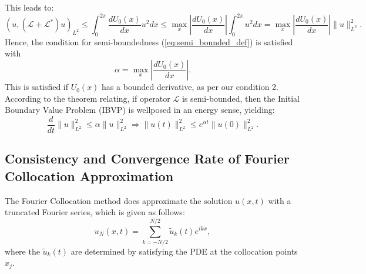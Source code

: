 This leads to:
\begin{equation}
	(u, (\mathcal{L}+\mathcal{L}^*)u)_{L^2} \leq \int_0^{2\pi} \frac{dU_0(x)}{dx}u^2 dx \leq  \max_x\left|\frac{dU_0(x)}{dx}\right| \int_0^{2\pi} u^2 dx = \max_x\left|\frac{dU_0(x)}{dx}\right| \|u\|^2_{L^2}.
	\label{eq:wellposed_cond_deriv}
\end{equation}
Hence, the condition for semi-boundedness (\ref{eq:semi_bounded_def}) is satisfied with
\begin{equation}
	\alpha = \max_x\left|\frac{dU_0(x)}{dx}\right|.
	\label{eq:alpha_val}
\end{equation}
This is satisfied if $U_0(x)$ has a bounded derivative, as per our condition 2.
According to the theorem relating, if operator $\mathcal{L}$ is semi-bounded, then the Initial Boundary Value Problem (IBVP) is wellposed in an energy sense, yielding:
\begin{equation}
	\frac{d}{d t}\|u\|_{L^2}^2 \leq \alpha\|u\|_{L^2}^2 \Rightarrow\|u(t)\|_{L^2}^2 \leq e^{\alpha t}\|u(0)\|_{L^2}^2.
	\label{eq:wellposed_result}
\end{equation}

\subsection{Consistency and Convergence Rate of Fourier Collocation Approximation}\label{sub:consistency_and_convergence_rate_of_fourier_collocation_approximation}

The Fourier Collocation method does approximate the solution $u(x,t)$ with a truncated Fourier series, which is given as follows:
\begin{equation}
	u_N(x,t) = \sum_{k=-N/2}^{N/2} \tilde{u}_k(t) e^{ikx},
	\label{eq:fourier_approx}
\end{equation}
where the $\tilde{u}_k(t)$ are determined by satisfying the PDE at the collocation points $x_j$.

